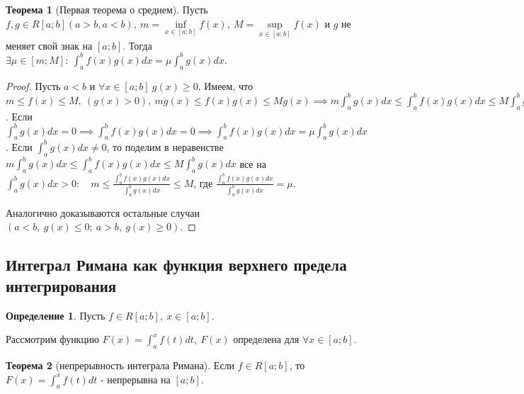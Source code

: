 \documentclass{report}
\theoremstyle{definition}
\newtheorem{definition}{Определение}[section]
\newtheorem{theorem}{Теорема}[section]
\begin{document}
\begin{theorem}[Первая теорема о среднем]
  Пусть $f,g\in R[a;b] (a>b, a<b), \ m = \underset{x\in[a;b]}{\inf}f(x), \ M = \underset{x\in[a;b]}{\sup}f(x)$
  и $g$ не меняет свой знак на $[a;b]$. Тогда $\exists \mu \in [m;M]: \ \int_{a}^{b}f(x)g(x)dx = \mu \int_{a}^{b}
    g(x)dx$.
\end{theorem}

\begin{proof}
  Пусть $a<b$ и $\forall x \in [a;b] \ g(x) \geqslant 0$. Имеем, что $m\leqslant f(x) \leqslant M, \ (g(x) > 0), \
    mg(x) \leqslant f(x)g(x) \leqslant Mg(x) \implies m \int_{a}^{b}g(x)dx \leqslant \int_{a}^{b}f(x)g(x)dx
    \leqslant M\int_{a}^{b}g(x)dx$. Если $\int_{a}^{b}g(x)dx = 0 \implies \int_{a}^{b}f(x)g(x)dx = 0 \implies
    \int_{a}^{b}f(x)g(x)dx = \mu \int_{a}^{b}g(x)dx$. Если $\int_{a}^{b}g(x)dx \ne 0$, то поделим в неравенстве
  $m \int_{a}^{b}g(x)dx \leqslant \int_{a}^{b}f(x)g(x)dx \leqslant M\int_{a}^{b}g(x)dx$ все на $\int_{a}^{b}
    g(x)dx > 0: \quad m \leqslant \frac{\int_{a}^{b}f(x)g(x)dx}{\int_{a}^{b}g(x)dx} \leqslant M$, где
  $\frac{\int_{a}^{b}f(x)g(x)dx}{\int_{a}^{b}g(x)dx} = \mu$.

  Аналогично доказываются остальные случаи $(a<b, \ g(x) \leqslant 0; \ a>b, \ g(x)\geqslant 0)$.
\end{proof}

\subsection{Интеграл Римана как функция верхнего предела интегрирования}

\begin{definition}
  Пусть $f\in R[a;b], \ x \in [a;b]$.

  Рассмотрим функцию $F(x) = \int_{a}^{x}f(t)dt, \ F(x)$ определена для $\forall x \in [a;b]$.
\end{definition}

\begin{theorem}[непрерывность интеграла Римана]
  Если $f\in R[a;b]$, то $F(x) = \int_{a}^{x}f(t)dt$ - непрерывна на $[a;b]$.
\end{theorem}
\end{document}
